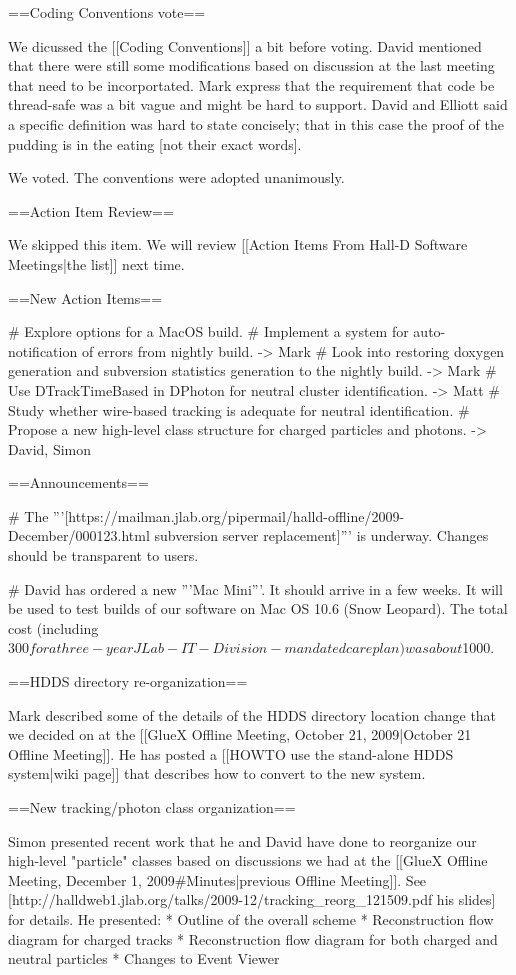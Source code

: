 \documentclass[xcolor=dvipsnames]{beamer}
\begin{document}
{==Coding Conventions vote==

We dicussed the [[Coding Conventions]] a bit before voting. David mentioned that there were still some modifications based on discussion at the last meeting that need to be incorportated. Mark express that the requirement that code be thread-safe was a bit vague and might be hard to support. David and Elliott said a specific definition was hard to state concisely; that in this case the proof of the pudding is in the eating [not their exact words].

We voted. The conventions were adopted unanimously.

==Action Item Review==

We skipped this item. We will review [[Action Items From Hall-D Software Meetings|the list]] next time.

==New Action Items==

# Explore options for a MacOS build.
# Implement a system for auto-notification of errors from nightly build. -> Mark
# Look into restoring doxygen generation and subversion statistics generation to the nightly build. -> Mark
# Use DTrackTimeBased in DPhoton for neutral cluster identification. -> Matt
# Study whether wire-based tracking is adequate for neutral identification.
# Propose a new high-level class structure for charged particles and photons. -> David, Simon

==Announcements==

# The '''[https://mailman.jlab.org/pipermail/halld-offline/2009-December/000123.html subversion server replacement]''' is underway. Changes should be transparent to users.

# David has ordered a new '''Mac Mini'''. It should arrive in a few weeks. It will be used to test builds of our software on Mac OS 10.6 (Snow Leopard). The total cost (including $300 for a three-year JLab-IT-Division-mandated care plan) was about $1000.

==HDDS directory re-organization==

Mark described some of the details of the HDDS directory location change that we decided on at the [[GlueX Offline Meeting, October 21, 2009|October 21 Offline Meeting]]. He has posted a [[HOWTO use the stand-alone HDDS system|wiki page]] that describes how to convert to the new system.

==New tracking/photon class organization==

Simon presented recent work that he and David have done to reorganize our high-level "particle" classes based on discussions we had at the [[GlueX Offline Meeting, December 1, 2009#Minutes|previous Offline Meeting]]. See [http://halldweb1.jlab.org/talks/2009-12/tracking_reorg_121509.pdf his slides] for details. He presented:
* Outline of the overall scheme
* Reconstruction flow diagram for charged tracks
* Reconstruction flow diagram for both charged and neutral particles
* Changes to Event Viewer

}
\end{document}
